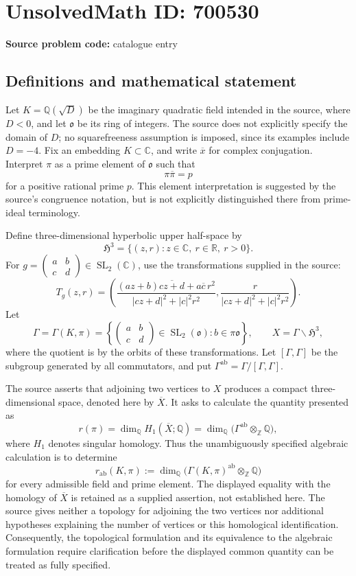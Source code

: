 \documentclass[11pt]{article}
\newcommand{\Z}{\mathbb{Z}}
\newcommand{\Q}{\mathbb{Q}}
\newcommand{\R}{\mathbb{R}}
\newcommand{\C}{\mathbb{C}}
\begin{document}
\section*{UnsolvedMath ID: 700530}
\textbf{Source problem code:} catalogue entry
\subsection{Definitions and mathematical statement}
Let \(K=\Q(\sqrt D)\) be the imaginary quadratic field intended in the source, where \(D<0\), and let \(\mathfrak o\) be its ring of integers. The source does not explicitly specify the domain of \(D\); no squarefreeness assumption is imposed, since its examples include \(D=-4\). Fix an embedding \(K\subset\C\), and write \(\overline{x}\) for complex conjugation. Interpret \(\pi\) as a prime element of \(\mathfrak o\) such that
\[
\pi\overline\pi=p
\]
for a positive rational prime \(p\). This element interpretation is suggested by the source's congruence notation, but is not explicitly distinguished there from prime-ideal terminology.

Define three-dimensional hyperbolic upper half-space by
\[
\mathfrak H^3=\{(z,r):z\in\C,\ r\in\R,\ r>0\}.
\]
For \(g=\begin{pmatrix}a&b\\c&d\end{pmatrix}\in\operatorname{SL}_2(\C)\), use the transformations supplied in the source:
\[
T_g(z,r)=\left(
\frac{(az+b)\overline{cz+d}+a\overline c\,r^2}
{|cz+d|^2+|c|^2r^2},
\frac{r}{|cz+d|^2+|c|^2r^2}
\right).
\]
Let
\[
\Gamma=\Gamma(K,\pi)=
\left\{
\begin{pmatrix}a&b\\c&d\end{pmatrix}\in\operatorname{SL}_2(\mathfrak o):
b\in\pi\mathfrak o
\right\},
\qquad
X=\Gamma\backslash\mathfrak H^3,
\]
where the quotient is by the orbits of these transformations. Let \([\Gamma,\Gamma]\) be the subgroup generated by all commutators, and put \(\Gamma^{\mathrm{ab}}=\Gamma/[\Gamma,\Gamma]\).

The source asserts that adjoining two vertices to \(X\) produces a compact three-dimensional space, denoted here by \(\overline X\). It asks to calculate the quantity presented as
\[
r(\pi)
=\dim_{\Q}H_1(\overline X;\Q)
=\dim_{\Q}\bigl(\Gamma^{\mathrm{ab}}\otimes_{\Z}\Q\bigr),
\]
where \(H_1\) denotes singular homology. Thus the unambiguously specified algebraic calculation is to determine
\[
r_{\mathrm{ab}}(K,\pi)
:=\dim_{\Q}\bigl(\Gamma(K,\pi)^{\mathrm{ab}}\otimes_{\Z}\Q\bigr)
\]
for every admissible field and prime element. The displayed equality with the homology of \(\overline X\) is retained as a supplied assertion, not established here. The source gives neither a topology for adjoining the two vertices nor additional hypotheses explaining the number of vertices or this homological identification. Consequently, the topological formulation and its equivalence to the algebraic formulation require clarification before the displayed common quantity can be treated as fully specified.
\end{document}
